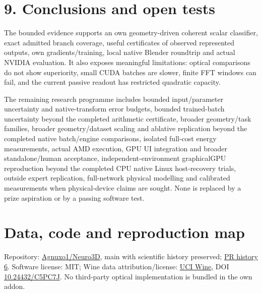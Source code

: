 \documentclass[11pt]{article}
\begin{document}
\section*{9. Conclusions and open tests}

The bounded evidence supports an own geometry-driven coherent scalar classifier, exact admitted branch coverage, useful certificates of observed represented outputs, own gradients/training, local native Blender roundtrip and actual NVIDIA evaluation. It also exposes meaningful limitations: optical comparisons do not show superiority, small CUDA batches are slower, finite FFT windows can fail, and the current passive readout has restricted quadratic capacity.

The remaining research programme includes bounded input/parameter uncertainty and native-transform error budgets, bounded trained-batch uncertainty beyond the completed arithmetic certificate, broader geometry/task families, broader geometry/dataset scaling and ablative replication beyond the completed native batch/engine comparisons, isolated full-cost energy measurements, actual AMD execution, GPU UI integration and broader standalone/human acceptance, independent-environment graphicalGPU reproduction beyond the completed CPU native Linux host-recovery trials, outside expert replication, full-network physical modelling and calibrated measurements when physical-device claims are sought. None is replaced by a prize aspiration or by a passing software test.

\section*{Data, code and reproduction map}

Repository: \href{https://github.com/Agnuxo1/Neuro3D}{Agnuxo1/Neuro3D}, main with scientific history preserved; \href{https://github.com/Agnuxo1/Neuro3D/pull/6}{PR history 6}. Software license: MIT; Wine data attribution/license: \href{https://archive.ics.uci.edu/dataset/109/wine}{UCI Wine}, DOI \href{https://doi.org/10.24432/C5PC7J}{10.24432/C5PC7J}. No third-party optical implementation is bundled in the own addon.
\end{document}
